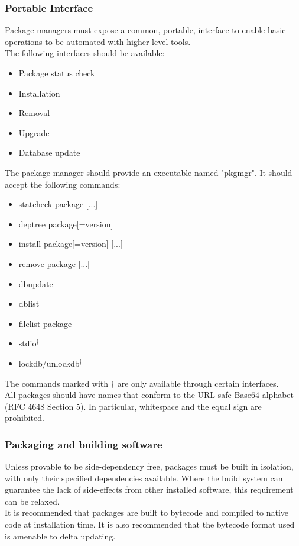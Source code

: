 \subsubsection{Portable Interface}
Package managers must expose a common, portable, interface to enable basic operations to be automated with higher-level tools.\\
The following interfaces should be available:
\begin{itemize}
	\item Package status check
	\item Installation
	\item Removal
	\item Upgrade
	\item Database update
\end{itemize}
The package manager should provide an executable named "pkgmgr". It should accept the following commands:
\begin{itemize}
	\item statcheck package [...]
	\item deptree package[=version]
	\item install package[=version] [...]
	\item remove package [...]
	\item dbupdate
	\item dblist
	\item filelist package
	\item stdio$^\dagger$
	\item lockdb/unlockdb$^\dagger$
\end{itemize}
The commands marked with $\dagger$ are only available through certain interfaces.\\
All packages should have names that conform to the URL-safe Base64 alphabet (RFC 4648 Section 5). In particular, whitespace and the equal sign are prohibited.
\subsubsection{Packaging and building software}
Unless provable to be side-dependency free, packages must be built in isolation, with only their specified dependencies available. Where the build system can guarantee the lack of side-effects from other installed software, this requirement can be relaxed.\\
It is recommended that packages are built to bytecode and compiled to native code at installation time. It is also recommended that the bytecode format used is amenable to delta updating.
